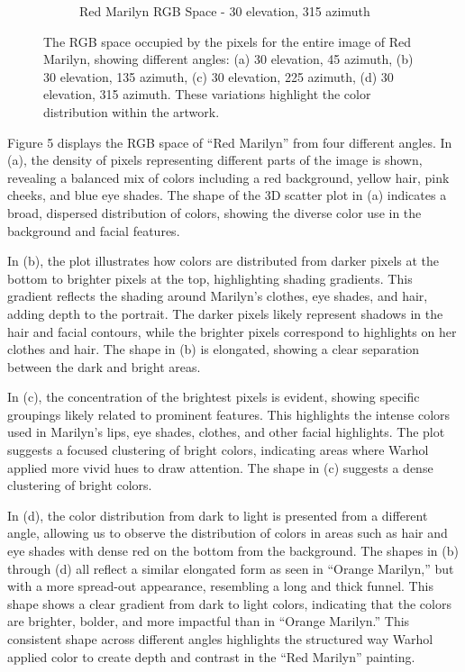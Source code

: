 \documentclass{article}
\begin{document}
\begin{figure}[ht]
\begin{subfigure}{0.45\textwidth}
    \caption{Red Marilyn RGB Space - 30 \degree elevation, 315 \degree azimuth}
    \label{fig:4_8_red_marilyn_original_scatter}
  \end{subfigure}
  \caption{The RGB space occupied by the pixels for the entire image of Red Marilyn, showing different angles: (a) 30 \degree elevation, 45 \degree azimuth, (b) 30 \degree elevation, 135 \degree azimuth, (c) 30 \degree elevation, 225 \degree azimuth, (d) 30 \degree elevation, 315 \degree azimuth. These variations highlight the color distribution within the artwork.}
  \label{fig:red_marilyn_original_scatter_2}
\end{figure}

Figure 5 displays the RGB space of ``Red Marilyn'' from four different
angles. In (a), the density of pixels representing different parts of
the image is shown, revealing a balanced mix of colors including a red
background, yellow hair, pink cheeks, and blue eye shades. The shape of
the 3D scatter plot in (a) indicates a broad, dispersed distribution of
colors, showing the diverse color use in the background and facial
features.

In (b), the plot illustrates how colors are distributed from darker
pixels at the bottom to brighter pixels at the top, highlighting shading
gradients. This gradient reflects the shading around Marilyn's clothes,
eye shades, and hair, adding depth to the portrait. The darker pixels
likely represent shadows in the hair and facial contours, while the
brighter pixels correspond to highlights on her clothes and hair. The
shape in (b) is elongated, showing a clear separation between the dark
and bright areas.

In (c), the concentration of the brightest pixels is evident, showing
specific groupings likely related to prominent features. This highlights
the intense colors used in Marilyn's lips, eye shades, clothes, and
other facial highlights. The plot suggests a focused clustering of
bright colors, indicating areas where Warhol applied more vivid hues to
draw attention. The shape in (c) suggests a dense clustering of bright
colors.

In (d), the color distribution from dark to light is presented from a
different angle, allowing us to observe the distribution of colors in
areas such as hair and eye shades with dense red on the bottom from the
background. The shapes in (b) through (d) all reflect a similar
elongated form as seen in ``Orange Marilyn,'' but with a more spread-out
appearance, resembling a long and thick funnel. This shape shows a clear
gradient from dark to light colors, indicating that the colors are
brighter, bolder, and more impactful than in ``Orange Marilyn.'' This
consistent shape across different angles highlights the structured way
Warhol applied color to create depth and contrast in the ``Red Marilyn''
painting.
\end{document}

